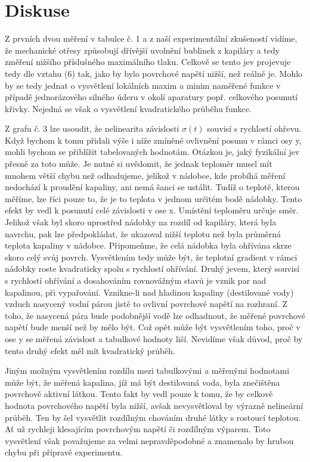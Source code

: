 \documentclass[a4paper]{article}
\begin{document}
\section*{Diskuse}
\par Z prvních dvou měření v tabulce č. 1 a z naší experimentální zkušeností vidíme, že mechanické otřesy způsobují dřívější uvolnění bublinek z kapiláry a tedy změření nižšího příslušného maximálního tlaku. Celkově se tento jev projevuje tedy dle vztahu (6) tak, jako by bylo povrchové napětí nižší, než reálně je. Mohlo by se tedy jednat o vysvětlení lokálních maxim a minim naměřené funkce v případě jednorázového silného úderu v okolí aparatury popř. celkového posunutí křivky. Nejedná se však o vysvětlení kvadratického průběhu funkce.
\par Z grafu č. 3  lze usoudit, že nelinearita závislosti $\sigma(t)$ souvisí s rychlostí ohřevu. Když bychom k tomu přidali výše i níže zmíněné ovlivnění posunu v rámci osy y, mohli bychom se přiblížit tabelovaných hodnotám. Otázkou je, jaký fyzikální jev přesně za toto může. Je nutné si uvědomit, že jednak teploměr musel mít mnohem větší chybu než odhadujeme, jelikož v nádobce, kde probíhá měření nedochází k proudění kapaliny, ani nemá šanci se ustálit. Tudíž o teplotě, kterou měříme, lze říci pouze to, že je to teplota v jednom určitém bodě nádobky. Tento efekt by vedl k posunutí celé závislosti v ose x. Umístění teploměru určuje směr. Jelikož však byl skoro uprostřed nádobky na rozdíl od kapiláry, která byla navrchu, pak lze předpokládat, že ukazoval nižší teplotu než byla průměrná teplota kapaliny v nádobce. Připomeňme, že celá nádobka byla ohřívána skrze skoro celý svůj povrch. Vysvětlením tedy může být, že teplotní gradient v rámci nádobky roste kvadraticky spolu s rychlostí ohřívání. Druhý jevem, který souvisí s rychlostí ohřívání a dosahováním rovnovážným stavů je vznik par nad kapalinou, při vypařování. Vznikne-li nad hladinou kapaliny (destilované vody) vzduch nasycený vodní párou jistě to ovlivní povrchové napětí na rozhraní. Z toho, že nasycená pára bude podobnější vodě lze odhadnout, že měřené povrchové napětí bude menší než by mělo být. Což opět může být vysvětlením toho, proč v ose y se měřená závislost a tabulkové hodnoty liší. Nevidíme však důvod, proč by tento druhý efekt měl mít kvadratický průběh.
\par Jiným možným vysvětlením rozdílu mezi tabulkovými a měřenými hodnotami může být, že měřená kapalina, jíž má být destilovaná voda, byla znečištěna povrchově aktivní látkou. Tento fakt by vedl pouze k tomu, že by celkově hodnota povrchového napětí byla nižší, avšak nevysvětloval by výrazně nelineární průběh. Ten by šel vysvětlit rozdílným chováním druhé látky s rostoucí teplotou. Ať už rychleji klesajícím povrchovým napětí či rozdílným výparem. Toto vysvětlení však považujeme za velmi nepravděpodobné a znamenalo by hrubou chybu při přípravě experimentu.
\end{document}
